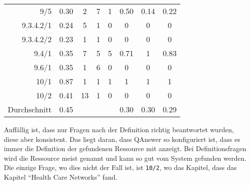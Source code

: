\begin{longtable}{r c c c c c c c}
  9/5           & 0.30  & 2     & 7     & 1             & 0.50  & 0.14  & 0.22    \\
  9.3.4.2/1     & 0.24  & 5     & 1     & 0             & 0     & 0     & 0       \\
  9.3.4.2/2     & 0.23  & 1     & 1     & 0             & 0     & 0     & 0       \\
  9.4/1         & 0.35  & 7     & 5     & 5             & 0.71  & 1     & 0.83    \\
  9.6/1         & 0.35  & 1     & 6     & 0             & 0     & 0     & 0       \\
  10/1          & 0.87  & 1     & 1     & 1             & 1     & 1     & 1       \\
  10/2          & 0.41  & 13    & 1     & 0             & 0     & 0     & 0       \\
  \midrule
  Durchschnitt  & 0.45  &       &       &               & 0.30  & 0.30  & 0.29    \\
  \bottomrule
\end{longtable}

Auffällig ist, dass nur Fragen nach der Definition richtig beantwortet wurden, diese aber konsistent.
Das liegt daran, dass QAnswer so konfiguriert ist, dass es immer die Definition der gefundenen Ressource mit anzeigt.
Bei Definitionsfragen wird die Ressource meist genannt und kann so gut vom System gefunden werden.
Die einzige Frage, wo dies nicht der Fall ist, ist \texttt{10/2}, wo das Kapitel, dass das Kapitel \enquote{Health Care Networks} fand.

